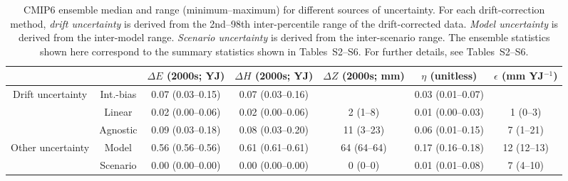 \begin{table*}[t]
\centering
\caption{CMIP6 ensemble median and range (minimum–maximum) for different sources of uncertainty. For each drift-correction method, \emph{drift uncertainty} is derived from the 2nd--98th inter-percentile range of the drift-corrected data. \emph{Model uncertainty} is derived from the inter-model range. \emph{Scenario uncertainty} is derived from the inter-scenario range. The ensemble statistics shown here correspond to the summary statistics shown in Tables~S2--S6. For further details, see Tables~S2--S6.}
\begin{tabular}{cc|c|c|c|c|c}
\toprule
 &  & $\Delta E$ (2000s; YJ) & $\Delta H$ (2000s; YJ) & $\Delta Z$ (2000s; mm) & $\eta$ (unitless) & $\epsilon$ (mm YJ$^{-1}$) \\
\midrule
\multirow[c]{3}{*}{Drift uncertainty} & Int.-bias & 0.07 (0.03–0.15) & 0.07 (0.03–0.16) &  & 0.03 (0.01–0.07) &  \\
 & Linear & 0.02 (0.00–0.06) & 0.02 (0.00–0.06) & 2 (1–8) & 0.01 (0.00–0.03) & 1 (0–3) \\
 & Agnostic & 0.09 (0.03–0.18) & 0.08 (0.03–0.20) & 11 (3–23) & 0.06 (0.01–0.15) & 7 (1–21) \\
\midrule
\multirow[c]{2}{*}{Other uncertainty} & Model & 0.56 (0.56–0.56) & 0.61 (0.61–0.61) & 64 (64–64) & 0.17 (0.16–0.18) & 12 (12–13) \\
 & Scenario & 0.00 (0.00–0.00) & 0.00 (0.00–0.00) & 0 (0–0) & 0.01 (0.01–0.08) & 7 (4–10) \\
\bottomrule
\end{tabular}
\end{table*}
